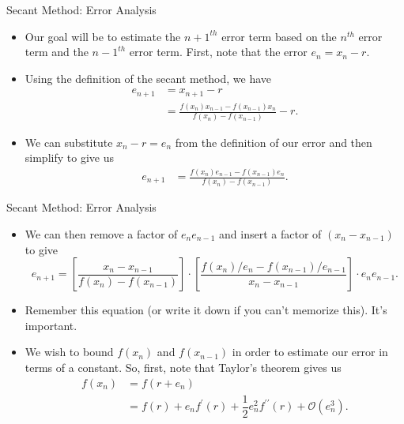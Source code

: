 \documentclass[9pt, serif]{beamer}
\newcommand{\bi}{\begin{itemize}}
\newcommand{\ei}{\end{itemize}}
\begin{document}
\begin{frame}{\hspace{50mm}Secant Method: Error Analysis}
	\bi
		\item Our goal will be to estimate the $n+1^{th}$ error term based on the $n^{th}$ error term and the $n-1^{th}$ error term. First, note that the error $e_n=x_n-r$.
		\pause
		\item Using the definition of the secant method, we have
			\begin{align*}
				e_{n+1}&=x_{n+1}-r\\
				&=\frac{f(x_n)x_{n-1}-f(x_{n-1})x_n}{f(x_n)-f(x_{n-1})}-r.
			\end{align*}
		\pause
		\item We can substitute $x_n-r=e_n$ from the definition of our error and then simplify to give us
			\begin{align*}
				e_{n+1}&=\frac{f(x_n)e_{n-1}-f(x_{n-1})e_n}{f(x_n)-f(x_{n-1})}.
			\end{align*}
	\ei
\end{frame}

\begin{frame}{\hspace{50mm}Secant Method: Error Analysis}
	\bi
		\item We can then remove a factor of $e_ne_{n-1}$ and insert a factor of $(x_n-x_{n-1})$ to give
			\begin{equation}\label{factor}
				e_{n+1}=\left[\frac{x_n-x_{n-1}}{f(x_n)-f(x_{n-1})}\right]\cdot\left[\frac{f(x_n)/e_n-f(x_{n-1})/e_{n-1}}{x_n-x_{n-1}}\right]\cdot e_ne_{n-1}.
			\end{equation}
		\pause
		\item Remember this equation (or write it down if you can't memorize this). It's important. 
		\pause
		\item We wish to bound $f(x_n)$ and $f(x_{n-1})$ in order to estimate our error in terms of a constant. So, first, note that Taylor's theorem gives us
			\begin{align*}
				f(x_n)&=f(r+e_n)\\
				&=f(r)+e_nf^\prime(r)+\dfrac{1}{2}e^2_nf^{\prime\prime}(r)+\mathcal{O}(e^3_n).
			\end{align*}
	\ei
\end{frame}
\end{document}
